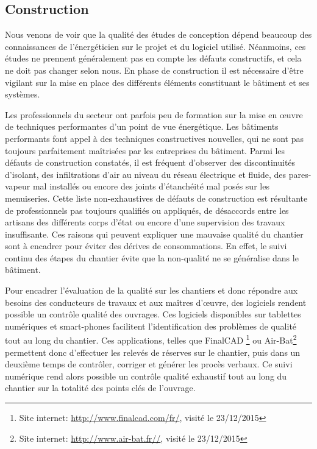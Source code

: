 \subsection{Construction}

Nous venons de voir que la qualité des études de conception dépend beaucoup des connaissances de l'énergéticien sur le projet et du logiciel utilisé. Néanmoins, ces études ne prennent généralement pas en compte les défauts constructifs, et cela ne doit pas changer selon nous.  En phase de construction il est nécessaire d'être vigilant sur la mise en place des différents éléments constituant le bâtiment et ses systèmes. 

Les professionnels du secteur ont parfois peu de formation sur la mise en œuvre de techniques performantes d'un point de vue énergétique. Les bâtiments performants font appel à des techniques constructives nouvelles, qui ne sont pas toujours parfaitement maîtrisées par les entreprises du bâtiment. Parmi les défauts de construction constatés, il est fréquent d'observer des discontinuités d'isolant, des infiltrations d'air au niveau du réseau électrique et fluide, des pares-vapeur mal installés ou encore des joints d'étanchéité mal posés sur les menuiseries. Cette liste non-exhaustives de défauts de construction est résultante de professionnels pas toujours qualifiés ou appliqués, de désaccords entre les artisans des différents corps d'état ou encore d'une supervision des travaux insuffisante. Ces raisons qui peuvent expliquer une mauvaise qualité du chantier sont à encadrer pour éviter des dérives de consommations. En effet, le suivi continu des étapes du chantier évite que la non-qualité ne se généralise dans le bâtiment. 

Pour encadrer l'évaluation de la qualité sur les chantiers et donc répondre aux besoins des conducteurs de travaux et aux maîtres d'œuvre, des logiciels rendent possible un contrôle qualité des ouvrages. Ces logiciels disponibles sur tablettes numériques et smart-phones facilitent l'identification des problèmes de qualité tout au long du chantier. Ces applications, telles que FinalCAD \footnote{Site internet: \url{http://www.finalcad.com/fr/}, visité le 23/12/2015} ou Air-Bat\footnote{Site internet: \url{http://www.air-bat.fr//}, visité le 23/12/2015} permettent donc d'effectuer les relevés de réserves sur le chantier, puis dans un deuxième temps de contrôler, corriger et générer les procès verbaux. Ce suivi numérique rend alors possible un contrôle qualité exhaustif tout au long du chantier sur la totalité des points clés de l'ouvrage.

